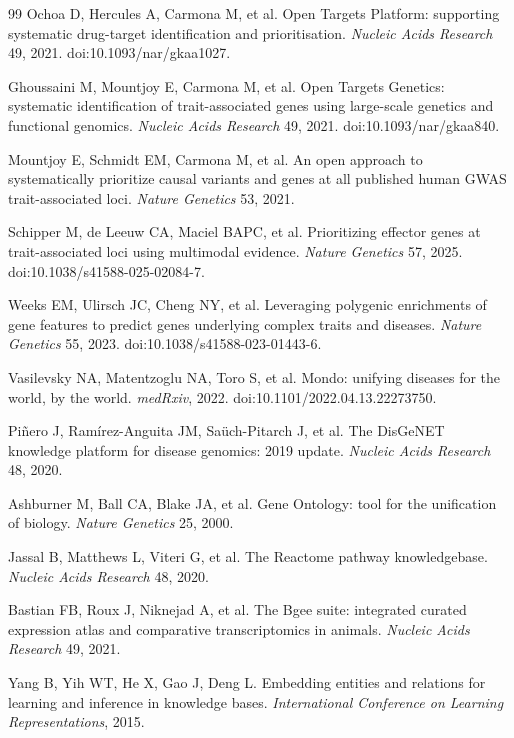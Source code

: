 \documentclass[11pt]{article}
\begin{document}
\begin{thebibliography}{99}
 Ochoa D, Hercules A, Carmona M, et al. Open Targets Platform: supporting systematic drug-target identification and prioritisation. \textit{Nucleic Acids Research} 49, 2021. doi:10.1093/nar/gkaa1027.

 Ghoussaini M, Mountjoy E, Carmona M, et al. Open Targets Genetics: systematic identification of trait-associated genes using large-scale genetics and functional genomics. \textit{Nucleic Acids Research} 49, 2021. doi:10.1093/nar/gkaa840.

 Mountjoy E, Schmidt EM, Carmona M, et al. An open approach to systematically prioritize causal variants and genes at all published human GWAS trait-associated loci. \textit{Nature Genetics} 53, 2021.

 Schipper M, de Leeuw CA, Maciel BAPC, et al. Prioritizing effector genes at trait-associated loci using multimodal evidence. \textit{Nature Genetics} 57, 2025. doi:10.1038/s41588-025-02084-7.

 Weeks EM, Ulirsch JC, Cheng NY, et al. Leveraging polygenic enrichments of gene features to predict genes underlying complex traits and diseases. \textit{Nature Genetics} 55, 2023. doi:10.1038/s41588-023-01443-6.

 Vasilevsky NA, Matentzoglu NA, Toro S, et al. Mondo: unifying diseases for the world, by the world. \textit{medRxiv}, 2022. doi:10.1101/2022.04.13.22273750.

 Pi\~{n}ero J, Ram\'{i}rez-Anguita JM, Sa\"{u}ch-Pitarch J, et al. The DisGeNET knowledge platform for disease genomics: 2019 update. \textit{Nucleic Acids Research} 48, 2020.

 Ashburner M, Ball CA, Blake JA, et al. Gene Ontology: tool for the unification of biology. \textit{Nature Genetics} 25, 2000.

 Jassal B, Matthews L, Viteri G, et al. The Reactome pathway knowledgebase. \textit{Nucleic Acids Research} 48, 2020.

 Bastian FB, Roux J, Niknejad A, et al. The Bgee suite: integrated curated expression atlas and comparative transcriptomics in animals. \textit{Nucleic Acids Research} 49, 2021.

 Yang B, Yih WT, He X, Gao J, Deng L. Embedding entities and relations for learning and inference in knowledge bases. \textit{International Conference on Learning Representations}, 2015.


\end{thebibliography}
\end{document}
